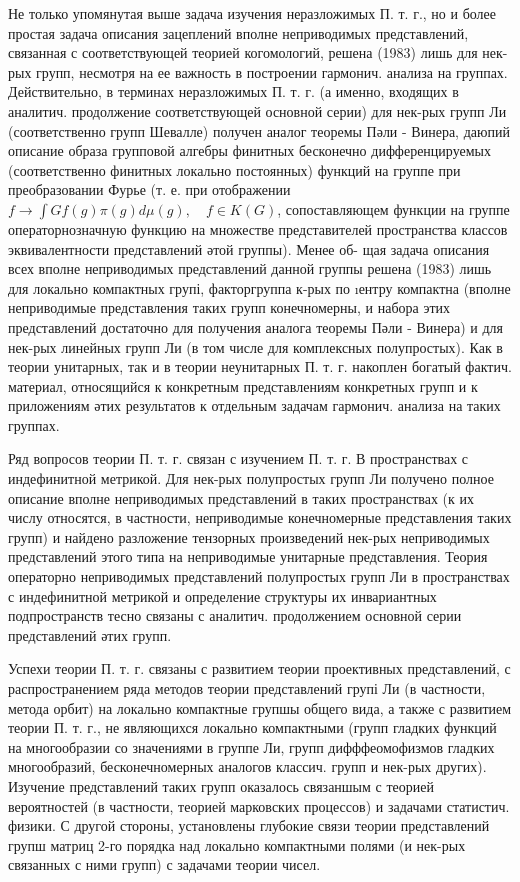 \documentclass[10pt]{article}
\begin{document}
Не только упомянутая выше задача изучения неразложимых П. т. г., но и более простая задача описания зацеплений вполне неприводимых представлений, связанная с соответствующей теорией когомологий, решена (1983) лишь для нек-рых групп, несмотря на ее важность в построении гармонич. анализа на группах. Действительно, в терминах неразложимых П. т. г. (а именно, входящих в аналитич. продолжение соответствующей основной серии) для нек-рых групп Ли (соответственно групп Шевалле) получен аналог теоремы Пәли - Винера, даюпий описание образа групповой алгебры финитных бесконечно дифференцируемых (соответственно финитных локально постоянных) функций на группе при преобразовании Фурье (т. е. при отображении $f \rightarrow \int G f(g) \pi(g) d \mu(g), \quad f \in K(G)$, сопоставляющем функции на группе операторнозначную функцию на множестве представителей пространства классов эквивалентности представлений әтой группы). Менее об- щая задача описания всех вполне неприводимых представлений данной группы решена (1983) лишь для локально компактных групі, факторгруппа к-рых по ıентру компактна (вполне неприводимые представления таких групп конечномерны, и набора этих представлений достаточно для получения аналога теоремы Пәли - Винера) и для нек-рых линейных групп Ли (в том числе для комплексных полупростых). Как в теории унитарных, так и в теории неунитарных П. т. г. накоплен богатый фактич. материал, относящийся к конкретным представлениям конкретных групп и к приложениям әтих результатов к отдельным задачам гармонич. анализа на таких группах.



Ряд вопросов теории П. т. г. связан с изучением П. т. г. В пространствах с индефинитной метрикой. Для нек-рых полупростых групп Ли получено полное описание вполне неприводимых представлений в таких пространствах (к их числу относятся, в частности, неприводимые конечномерные представления таких групп) и найдено разложение тензорных произведений нек-рых неприводимых представлений этого типа на неприводимые унитарные представления. Теория операторно неприводимых представлений полупростых групп Ли в пространствах с индефинитной метрикой и определение структуры их инвариантных подпространств тесно связаны с аналитич. продолжением основной серии представлений әтих групп.



Успехи теории П. т. г. связаны с развитием теории проективных представлений, с распространением ряда методов теории представлений групі Ли (в частности, метода орбит) на локально компактные групшы общего вида, а также с развитием теории П. т. г., не являющихся локально компактными (групп гладких функций на многообразии со значениями в группе Ли, групп дифффеомофизмов гладких многообразий, бесконечномерных аналогов классич. групп и нек-рых других). Изучение представлений таких групп оказалось связаншым с теорией вероятностей (в частности, теорией марковских процессов) и задачами статистич. физики. С другой стороны, установлены глубокие связи теории представлений групш матриц 2-го порядка над локально компактными полями (и нек-рых связанных с ними групп) с задачами теории чисел.
\end{document}
